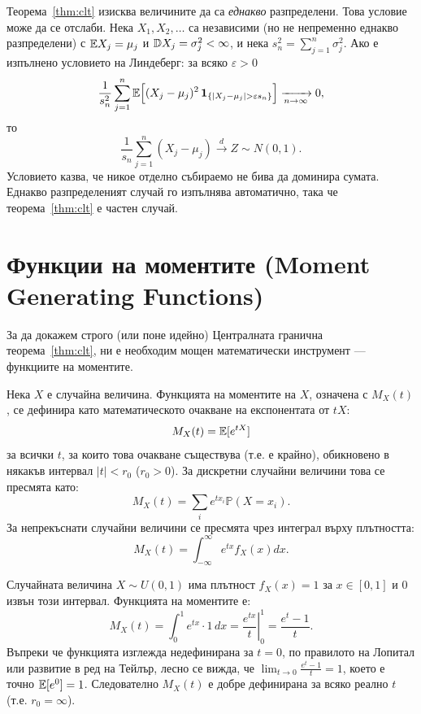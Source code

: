 \begin{supp}\label{supp:lindeberg}
Теорема~\ref{thm:clt} изисква величините да са \emph{еднакво} разпределени. Това условие
може да се отслаби. Нека $X_1, X_2, \dots$ са независими (но не непременно еднакво
разпределени) с $\mathbb{E} X_j = \mu_j$ и $\mathbb{D} X_j = \sigma_j^2 < \infty$, и нека
$s_n^2 = \sum_{j=1}^n \sigma_j^2$. Ако е изпълнено условието на Линдеберг: за всяко
$\varepsilon > 0$
\[
\frac{1}{s_n^2} \sum_{j=1}^{n} \mathbb{E}\Big[ (X_j - \mu_j)^2 \, \mathbf{1}_{\{|X_j - \mu_j| > \varepsilon s_n\}} \Big]
\xrightarrow[n \to \infty]{} 0,
\]
то
\[
\frac{1}{s_n} \sum_{j=1}^{n} (X_j - \mu_j) \xrightarrow{d} Z \sim N(0,1) .
\]
Условието казва, че никое отделно събираемо не бива да доминира сумата. Еднакво
разпределеният случай го изпълнява автоматично, така че теорема~\ref{thm:clt} е частен
случай.
\end{supp}

\section{Функции на моментите (Moment Generating Functions)}

За да докажем строго (или поне идейно) Централната гранична теорема~\ref{thm:clt}, ни е необходим мощен математически инструмент — функциите на моментите.

\begin{defn}
Нека $X$ е случайна величина. Функцията на моментите на $X$, означена с $M_X(t)$, се дефинира като математическото очакване на експонентата от $tX$:
\[ M_X(t) = \mathbb{E}[e^{tX}] \]
за всички $t$, за които това очакване съществува (т.е. е крайно), обикновено в някакъв интервал $|t| < r_0$ ($r_0 > 0$). За дискретни случайни величини това се пресмята като:
\[ M_X(t) = \sum_{i} e^{t x_i} \mathbb{P}(X = x_i). \]
За непрекъснати случайни величини се пресмята чрез интеграл върху плътността:
\[ M_X(t) = \int_{-\infty}^{\infty} e^{tx} f_X(x) dx. \]
\end{defn}

\begin{example}\label{ex:11-3}
Случайната величина $X \sim U(0,1)$ има плътност $f_X(x) = 1$ за $x \in [0,1]$ и 0 извън този интервал. Функцията на моментите е:
\[ M_X(t) = \int_0^1 e^{tx} \cdot 1 \, dx = \left. \frac{e^{tx}}{t} \right|_{0}^{1} = \frac{e^t - 1}{t}. \]
Въпреки че функцията изглежда недефинирана за $t=0$, по правилото на Лопитал или развитие в ред на Тейлър, лесно се вижда, че $\lim_{t \to 0} \frac{e^t - 1}{t} = 1$, което е точно $\mathbb{E}[e^0] = 1$. Следователно $M_X(t)$ е добре дефинирана за всяко реално $t$ (т.е. $r_0 = \infty$).

\end{example}

